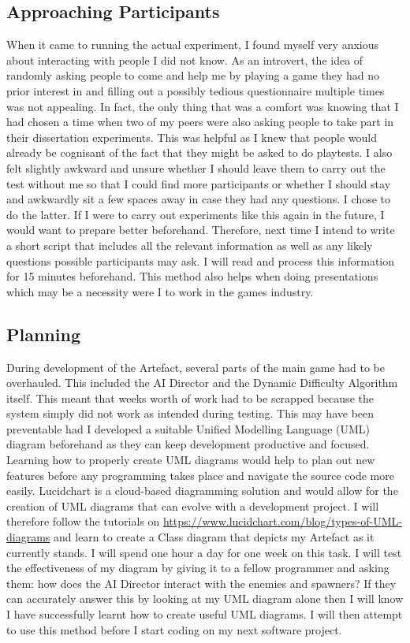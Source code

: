 \documentclass[journal]{IEEEtran}
\begin{document}
\subsection{Approaching Participants}
When it came to running the actual experiment, I found myself very anxious about interacting with people I did not know. As an introvert, the idea of randomly asking people to come and help me by playing a game they had no prior interest in and filling out a possibly tedious questionnaire multiple times was not appealing. In fact, the only thing that was a comfort was knowing that I had chosen a time when two of my peers were also asking people to take part in their dissertation experiments. This was helpful as I knew that people would already be cognisant of the fact that they might be asked to do playtests. I also felt slightly awkward and unsure whether I should leave them to carry out the test without me so that I could find more participants or whether I should stay and awkwardly sit a few spaces away in case they had any questions. I chose to do the latter. 
If I were to carry out experiments like this again in the future, I would want to prepare better beforehand. Therefore, next time I intend to write a short script that includes all the relevant information as well as any likely questions possible participants may ask. I will read and process this information for 15 minutes beforehand. This method also helps when doing presentations which may be a necessity were I to work in the games industry.


\subsection{Planning}
During development of the Artefact, several parts of the main game had to be overhauled. This included the AI Director and the Dynamic Difficulty Algorithm itself. This meant that weeks worth of work had to be scrapped because the system simply did not work as intended during testing. This may have been preventable had I developed a suitable Unified Modelling Language (UML) diagram beforehand as they can keep development productive and focused. Learning how to properly create UML diagrams would help to plan out new features before any programming takes place and navigate the source code more easily.
Lucidchart is a cloud-based diagramming solution and would allow for the creation of UML diagrams that can evolve with a development project. I will therefore follow the tutorials on \url{https://www.lucidchart.com/blog/types-of-UML-diagrams} and learn to create a Class diagram that depicts my Artefact as it currently stands. I will spend one hour a day for one week on this task. I will test the effectiveness of my diagram by giving it to a fellow programmer and asking them: how does the AI Director interact with the enemies and spawners? If they can accurately answer this by looking at my UML diagram alone then I will know I have successfully learnt how to create useful UML diagrams. I will then attempt to use this method before I start coding on my next software project.
\end{document}
